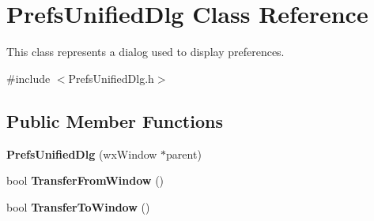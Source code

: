 \section{PrefsUnifiedDlg Class Reference}
\label{classPrefsUnifiedDlg}


This class represents a dialog used to display preferences.  


{\ttfamily \#include $<$PrefsUnifiedDlg.h$>$}\subsection*{Public Member Functions}
\begin{DoxyCompactItemize}
\item 
{\bf PrefsUnifiedDlg} (wxWindow $\ast$parent)
\item 
bool {\bf TransferFromWindow} ()\label{classPrefsUnifiedDlg_a2c5802ba169757622b28ceddec35f5ca}

\item 
bool {\bf TransferToWindow} ()\label{classPrefsUnifiedDlg_a893a12de0ad4a8be4438d4b3da81c87c}

\end{DoxyCompactItemize}
